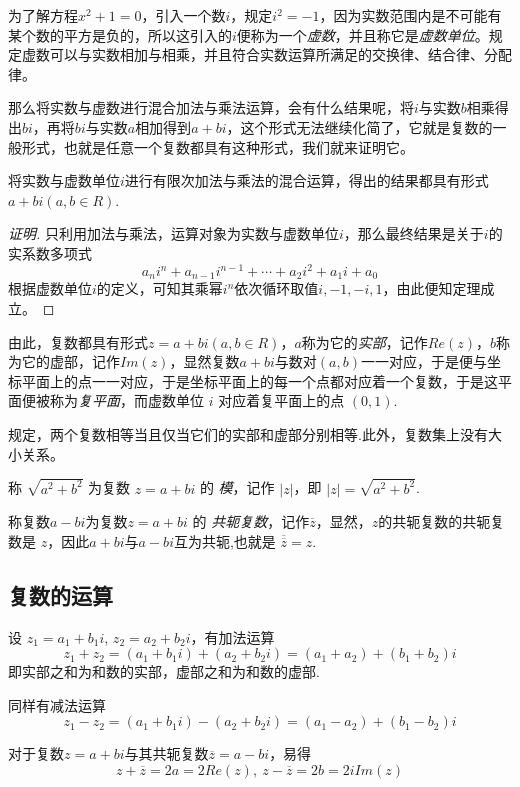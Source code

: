 为了解方程$x^2+1=0$，引入一个数$i$，规定$i^2=-1$，因为实数范围内是不可能有某个数的平方是负的，所以这引入的$i$便称为一个\emph{虚数}，并且称它是\emph{虚数单位}。规定虚数可以与实数相加与相乘，并且符合实数运算所满足的交换律、结合律、分配律。

那么将实数与虚数进行混合加法与乘法运算，会有什么结果呢，将$i$与实数$b$相乘得出$bi$，再将$bi$与实数$a$相加得到$a+bi$，这个形式无法继续化简了，它就是复数的一般形式，也就是任意一个复数都具有这种形式，我们就来证明它。

\begin{theorem}
  将实数与虚数单位$i$进行有限次加法与乘法的混合运算，得出的结果都具有形式$a+bi(a,b\in R)$.
\end{theorem}

\begin{proof}[证明]
  只利用加法与乘法，运算对象为实数与虚数单位$i$，那么最终结果是关于$i$的实系数多项式
  \[ a_ni^n+a_{n-1}i^{n-1} + \cdots + a_2i^2 + a_1i+a_0 \]
  根据虚数单位$i$的定义，可知其乘幂$i^n$依次循环取值$i,-1,-i,1$，由此便知定理成立。
\end{proof}

由此，复数都具有形式$z=a+bi(a,b\in R)$，$a$称为它的\emph{实部}，记作$Re(z)$，$b$称为它的虚部，记作$Im(z)$，显然复数$a+bi$与数对$(a,b)$一一对应，于是便与坐标平面上的点一一对应，于是坐标平面上的每一个点都对应着一个复数，于是这平面便被称为\emph{复平面}，而虚数单位 $i$ 对应着复平面上的点 $(0,1)$.

规定，两个复数相等当且仅当它们的实部和虚部分别相等.此外，复数集上没有大小关系。

称 $\sqrt{a^2+b^2}$ 为复数 $z=a+bi$ 的 \emph{模}，记作 $|z|$，即 $|z|=\sqrt{a^2+b^2}$.

称复数$a-bi$为复数$z=a+bi$ 的 \emph{共轭复数}，记作$\overline{z}$，显然，$z$的共轭复数的共轭复数是 $z$，因此$a+bi$与$a-bi$互为共轭,也就是 $\overline{\overline{z}}=z$.


\subsection{复数的运算}
\label{sec:operation-of-complex-number}

设 $z_1=a_1+b_1i$, $z_2=a_2+b_2i$，有加法运算
\[ z_1+z_2 = (a_1+b_1i)+(a_2+b_2i) = (a_1+a_2)+(b_1+b_2)i \]
即实部之和为和数的实部，虚部之和为和数的虚部.

同样有减法运算
\[ z_1-z_2 = (a_1+b_1i)-(a_2+b_2i) = (a_1-a_2)+(b_1-b_2)i \]

对于复数$z=a+bi$与其共轭复数$\overline{z}=a-bi$，易得
\[ z+\overline{z}=2a=2Re(z), \  z-\overline{z}=2b=2iIm(z) \]

